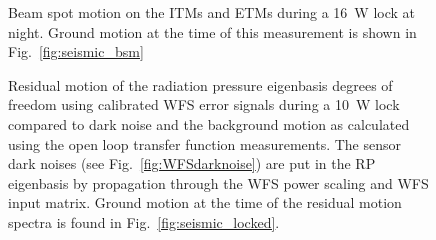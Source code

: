 \begin{figure}
\begin{centering}
\caption[Beam spot motion on the ITMs and ETMs during a 16~W
lock]{Beam spot motion on the ITMs and ETMs during a 16~W lock at
  night. Ground motion at the time of this measurement is shown in
  Fig.~\ref{fig:seismic_bsm}}%
\label{fig:bsm}
\end{centering}
\end{figure}


\begin{figure}
\begin{centering}
\caption[Residual motion of the radiation pressure eigenbasis degrees
of freedom]{Residual motion of the radiation pressure eigenbasis
  degrees of freedom using calibrated WFS error signals during a 10~W
  lock compared to dark noise and the background motion as calculated
  using the open loop transfer function measurements. The sensor dark
  noises (see Fig.~\ref{fig:WFSdarknoise}) are put in the RP
  eigenbasis by propagation through the WFS power scaling and WFS
  input matrix. Ground motion at the time of the residual motion
  spectra is found in Fig.~\ref{fig:seismic_locked}.}
\label{fig:WFSresidual}
\end{centering}
\end{figure}


